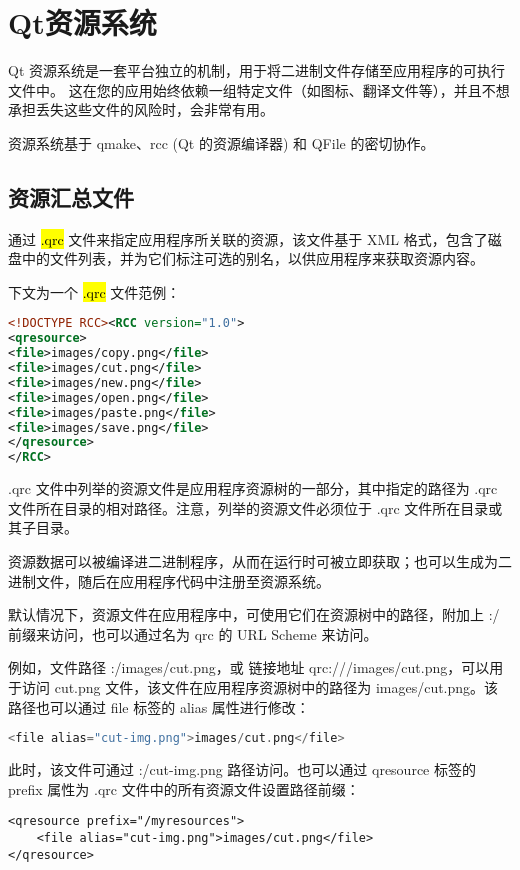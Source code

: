 \chapter{Qt资源系统}

Qt 资源系统是一套平台独立的机制，用于将二进制文件存储至应用程序的可执行文件中。
这在您的应用始终依赖一组特定文件（如图标、翻译文件等），并且不想承担丢失这些文件的风险时，会非常有用。

资源系统基于 qmake、rcc (Qt 的资源编译器) 和 QFile 的密切协作。

\section{资源汇总文件}

通过 \hl{.qrc} 文件来指定应用程序所关联的资源，该文件基于 XML 格式，包含了磁盘中的文件列表，并为它们标注可选的别名，以供应用程序来获取资源内容。

下文为一个 \hl{.qrc} 文件范例：

\begin{lstlisting}[language=XML]
<!DOCTYPE RCC><RCC version="1.0">
<qresource>
<file>images/copy.png</file>
<file>images/cut.png</file>
<file>images/new.png</file>
<file>images/open.png</file>
<file>images/paste.png</file>
<file>images/save.png</file>
</qresource>
</RCC>
\end{lstlisting}

.qrc 文件中列举的资源文件是应用程序资源树的一部分，其中指定的路径为 .qrc 文件所在目录的相对路径。注意，列举的资源文件必须位于 .qrc 文件所在目录或其子目录。

资源数据可以被编译进二进制程序，从而在运行时可被立即获取；也可以生成为二进制文件，随后在应用程序代码中注册至资源系统。

默认情况下，资源文件在应用程序中，可使用它们在资源树中的路径，附加上 :/ 前缀来访问，也可以通过名为 qrc 的 URL Scheme 来访问。

例如，文件路径 :/images/cut.png，或 链接地址 qrc:///images/cut.png，可以用于访问 cut.png 文件，该文件在应用程序资源树中的路径为 images/cut.png。该路径也可以通过 file 标签的 alias 属性进行修改：

\begin{lstlisting}[language=C++]
<file alias="cut-img.png">images/cut.png</file>
\end{lstlisting}

此时，该文件可通过 :/cut-img.png 路径访问。也可以通过 qresource 标签的 prefix 属性为 .qrc 文件中的所有资源文件设置路径前缀：

\begin{lstlisting}
<qresource prefix="/myresources">
    <file alias="cut-img.png">images/cut.png</file>
</qresource>
\end{lstlisting}

